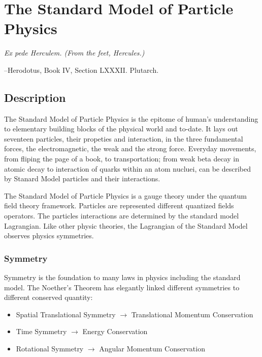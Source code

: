 \chapter{The Standard Model of Particle Physics}
\label{chapter:SM}

	
\epigraph{\textit{Ex pede Herculem. \newline(From the feet, Hercules.)}}{--Herodotus, Book IV, Section LXXXII. Plutarch.}




\section{Description}
The Standard Model of Particle Physics is the epitome of human's understanding to elementary building blocks of the physical world and to-date. It lays out seventeen particles, their propeties and interaction, in the three fundamental forces, the electromagnetic, the weak and the strong force. Everyday movements, from fliping the page of a book, to transportation; from weak beta decay in atomic decay to interaction of quarks within an atom nucluei, can be described by Stanard Model
particles and their interactions.

The Standard Model of Particle Physics is a gauge theory under the quantum field theory framework. Particles are represented different quantized fields operators. The particles interactions are determined by the standard model Lagrangian. Like other physic theories, the Lagrangian of the Standard Model observes physics symmetries.

\subsection*{Symmetry}
    Symmetry is the foundation to many laws in physics including the standard model. The Noether's Theorem has elegantly linked different symmetries to different conserved quantity: 

    \begin{itemize}
        \item Spatial Translational Symmetry $\rightarrow$ Translational Momentum Conservation

        \item Time Symmetry $\rightarrow$ Energy Conservation

        \item Rotational Symmetry $\rightarrow$ Angular Momentum Conservation

    \end{itemize}

